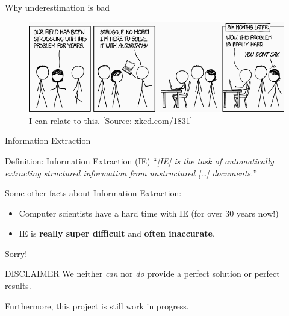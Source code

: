 \documentclass[xcolor=x11names, aspectratio=169,usenames,dvipsnames]{beamer}
\begin{document}
\begin{frame}{Why underestimation is bad}
\begin{center}
\begin{figure}
\includegraphics[width=\textwidth]{img/xkcd.png}
\caption{I can relate to this. [Source: xkcd.com/1831]}
\end{figure}
\end{center}
\end{frame}

\begin{frame}{Information Extraction}
\begin{block}{Definition: Information Extraction (IE)}\vspace{.5em}
\enquote{\textit{[IE] is the task of automatically extracting structured information from unstructured [\dots] documents.}}
\end{block}\pause\bigskip

\large{Some other facts about Information Extraction:}\normalsize
\begin{itemize}
\item Computer scientists have a hard time with IE (for over \alert{30 years} now!)\pause
\item IE is \textbf{\alert{really super difficult}} and \alert{\textbf{often inaccurate}}.
\end{itemize}
\end{frame}

\begin{frame}{Sorry!}
\begin{large}
\begin{alertblock}{\large DISCLAIMER}\vspace{.5em}
We neither \emph{can} nor \emph{do} provide a perfect solution or perfect results.

Furthermore, this project is still work in progress.
\end{alertblock}

\end{large}
\end{frame}
\end{document}
